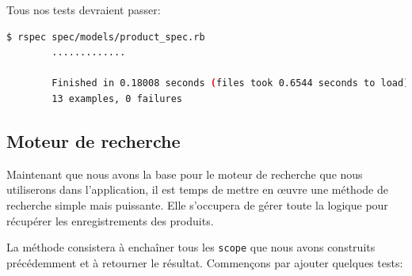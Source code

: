 \documentclass[]{report}
\begin{document}
      Tous nos tests devraient passer:

      \begin{scriptsize}
        \begin{lstlisting}[language=bash]
        $ rspec spec/models/product_spec.rb
        .............

        Finished in 0.18008 seconds (files took 0.6544 seconds to load)
        13 examples, 0 failures
        \end{lstlisting}
      \end{scriptsize}

    \subsection{Moteur de recherche}

      Maintenant que nous avons la base pour le moteur de recherche que nous utiliserons dans l'application, il est temps de mettre en œuvre une méthode de recherche simple mais puissante. Elle s'occupera de gérer toute la logique pour récupérer les enregistrements des produits.

      La méthode consistera à enchaîner tous les \verb|scope| que nous avons construits précédemment et à retourner le résultat. Commençons par ajouter quelques tests:
\end{document}

